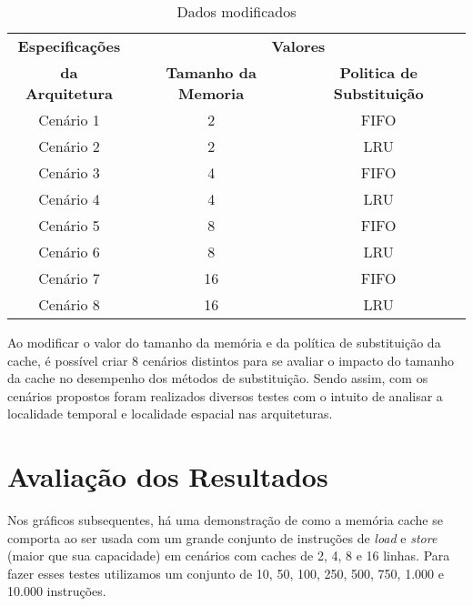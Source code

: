 \documentclass[conference]{IEEEtran}
\begin{document}
\begin{table}[H]
  \caption{Dados modificados}
  \centering
      \begin{tabular}{|c|c|c|}
          \hline
          \textbf{Especificações} & \multicolumn{2}{|c|}{\textbf{Valores}} \\
          \cline{2-3} 
          \textbf{da Arquitetura} & \textbf{Tamanho da Memoria} & \textbf{Politica de Substituição} \\
          \hline
          Cenário 1 & 2 & FIFO \\
          \hline
          Cenário 2 & 2 & LRU \\
          \hline
          Cenário 3 & 4 & FIFO\\
          \hline
          Cenário 4 & 4 & LRU\\
          \hline
          Cenário 5 & 8 & FIFO\\
          \hline
          Cenário 6 & 8 & LRU\\
          \hline
          Cenário 7 & 16 & FIFO\\
          \hline
          Cenário 8 & 16 & LRU\\
          \hline
      \end{tabular}
      \label{tab3}
\end{table}

Ao modificar o valor do tamanho da memória e da política de substituição da cache,
é possível criar 8 cenários distintos para se avaliar o impacto do tamanho da cache
no desempenho dos métodos de substituição. Sendo assim, com os cenários propostos
foram realizados diversos testes com o intuito de analisar a localidade temporal e
localidade espacial nas arquiteturas.

\section{Avaliação dos Resultados}


Nos gráficos subsequentes, há uma demonstração de como a memória cache se comporta 
ao ser usada com um grande conjunto de instruções de \emph{load} e \emph{store} 
(maior que sua capacidade) em cenários com caches de 2, 4, 8 e 16 linhas.
Para fazer esses testes utilizamos um conjunto de 10, 50, 100, 250, 500, 750, 1.000 e 10.000 
instruções.
\end{document}
